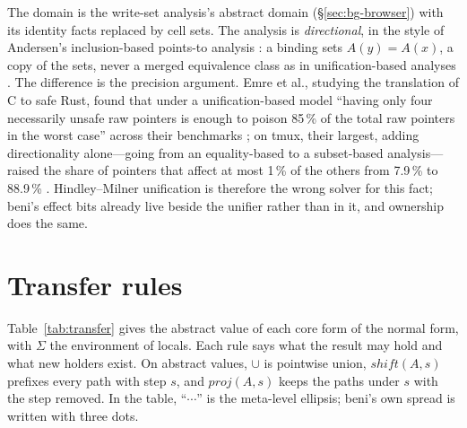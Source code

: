 The domain is the write-set analysis's abstract domain (\S\ref{sec:bg-browser}) with its identity
facts replaced by cell sets. The analysis is \emph{directional}, in the style of Andersen's
inclusion-based points-to analysis \citep{andersen1994program}: a binding  sets
$A(y) = A(x)$, a copy of the sets, never a merged equivalence class as in unification-based analyses
\citep{steensgaard1996points}. The difference is the precision argument. Emre et al., studying the
translation of C to safe Rust, found that under a unification-based model ``having only four
necessarily unsafe raw pointers is enough to poison 85\,\% of the total raw pointers in the worst
case'' across their benchmarks \citep[\S5]{emre2023aliasing}; on tmux, their largest, adding
directionality alone---going from an equality-based to a subset-based analysis---raised the share of
pointers that affect at most 1\,\% of the others from 7.9\,\% to 88.9\,\%
\citep[\S6, Table~2]{emre2023aliasing}. Hindley--Milner unification is therefore the wrong solver
for this fact; beni's effect bits already live beside the unifier rather than in it, and ownership
does the same.

\section{Transfer rules}
\label{sec:model-transfer}

Table~\ref{tab:transfer} gives the abstract value of each core form of the normal form, with $\Sigma$
the environment of locals. Each rule says what the result may hold and what new holders exist. On
abstract values, $\cup$ is pointwise union, $\mathit{shift}(A, s)$ prefixes every path with step $s$,
and $\mathit{proj}(A, s)$ keeps the paths under $s$ with the step removed. In the table, ``$\cdots$''
is the meta-level ellipsis; beni's own spread is written with three dots.

